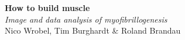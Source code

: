 \documentclass[a1,portrait]{a0poster}
\begin{document}


\begin{minipage}{0.75\linewidth}
\veryHuge \color{NavyBlue} \textbf{How to build muscle} \color{Black}\\ %
\Huge\textit{Image and data analysis of myofibrillogenesis}\\[1cm] %
\LARGE{Nico Wrobel, Tim Burghardt \& Roland Brandau}\\ %
\end{minipage}%
\begin{minipage}{0.25\linewidth}
\centering

\end{minipage}

\vspace{1cm} %

\end{document}
